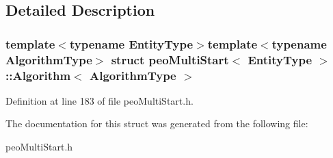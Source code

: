\subsection{Detailed Description}
\subsubsection*{template$<$typename Entity\-Type$>$template$<$typename Algorithm\-Type$>$ struct peo\-Multi\-Start$<$ Entity\-Type $>$::Algorithm$<$ Algorithm\-Type $>$}





Definition at line 183 of file peo\-Multi\-Start.h.

The documentation for this struct was generated from the following file:\begin{CompactItemize}
\item 
peo\-Multi\-Start.h\end{CompactItemize}
